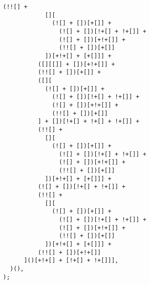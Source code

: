 \begin{lstlisting}[style=basicStyle, caption=alert('XSS') in JSFuck, label={lst:alertxssjsfuck}]
          (!![] +
            [][
              (![] + [])[+[]] +
                (![] + [])[!+[] + !+[]] +
                (![] + [])[+!+[]] +
                (!![] + [])[+[]]
            ])[+!+[] + [+[]]] +
          ([][[]] + [])[+!+[]] +
          (!![] + [])[+[]] +
          ([][
            (![] + [])[+[]] +
              (![] + [])[!+[] + !+[]] +
              (![] + [])[+!+[]] +
              (!![] + [])[+[]]
          ] + [])[!+[] + !+[] + !+[]] +
          (!![] +
            [][
              (![] + [])[+[]] +
                (![] + [])[!+[] + !+[]] +
                (![] + [])[+!+[]] +
                (!![] + [])[+[]]
            ])[+!+[] + [+[]]] +
          (![] + [])[!+[] + !+[]] +
          (!![] +
            [][
              (![] + [])[+[]] +
                (![] + [])[!+[] + !+[]] +
                (![] + [])[+!+[]] +
                (!![] + [])[+[]]
            ])[+!+[] + [+[]]] +
          (!![] + [])[+!+[]]
      ]()[+!+[] + [!+[] + !+[]]],
  )(),
);
\end{lstlisting}


